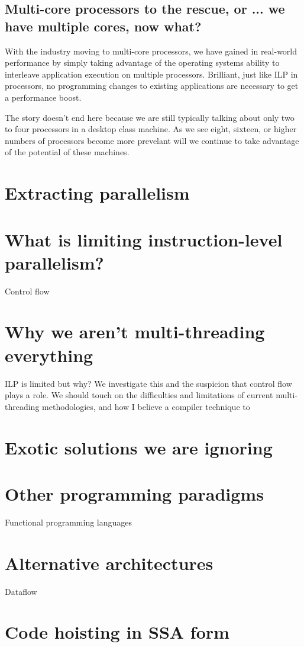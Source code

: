 \documentclass[12pt,twoside,letterpaper]{article}
\begin{document}
\subsection*{Multi-core processors to the rescue, or ... we have multiple cores, now what?}
With the industry moving to multi-core processors, we have gained in real-world performance by simply taking advantage of the operating systems ability to interleave application execution on multiple processors. Brilliant, just like ILP in processors, no programming changes to existing applications are necessary to get a performance boost.

The story doesn't end here because we are still typically talking about only two to four processors in a desktop class machine. As we see eight, sixteen, or higher numbers of processors become more prevelant will we continue to take advantage of the potential of these machines. 

\section*{Extracting parallelism}
\section*{What is limiting instruction-level parallelism?}
Control flow
\section*{Why we aren't multi-threading everything}

ILP is limited but why? We investigate this and the suspicion that control flow plays a role. We should touch on the difficulties and limitations of current multi-threading methodologies, and how I believe a compiler technique to 


\section*{Exotic solutions we are ignoring}
\section*{Other programming paradigms}
Functional programming languages
\section*{Alternative architectures}
Dataflow

\section*{Code hoisting in SSA form}
\end{document}
